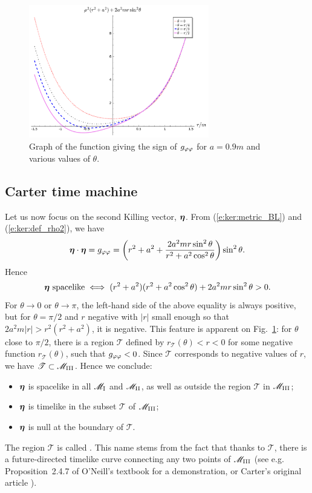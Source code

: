 \begin{figure}
\centerline{\includegraphics[width=0.7\textwidth]{ker_sign_gpp.pdf}}
\caption[]{\label{f:ker:sign_gpp} \footnotesize
Graph of the function giving the sign of $g_{\varphi\varphi}$ for $a=0.9m$
and various values of $\theta$.}
\end{figure}

\subsection{Carter time machine}

Let us now focus on the second Killing vector, $\bm{\eta}$.
From (\ref{e:ker:metric_BL}) and (\ref{e:ker:def_rho2}), we have
\[
    \bm{\eta}\cdot\bm{\eta} = g_{\varphi\varphi} = \left( r^2 + a^2 + \frac{2 a^2 m r \sin^2\theta}{r^2 + a^2\cos^2\theta} \right) \sin^2\theta .
\]
Hence
\[
    \bm{\eta}\ \mbox{spacelike} \iff
        (r^2 + a^2)(r^2 + a^2\cos^2\theta) + 2 a^2 m r \sin^2\theta > 0 .
\]
For $\theta\rightarrow 0$ or $\theta\rightarrow\pi$, the left-hand side of the above equality
is always positive, but for $\theta=\pi/2$ and $r$ negative with $|r|$
small enough so that $2 a^2 m |r| > r^2(r^2 + a^2)$, it is negative. This feature
is apparent on Fig.~\ref{f:ker:sign_gpp}: for $\theta$ close to $\pi/2$,
there is a region $\mathscr{T}$ defined by $r_{\mathscr{T}}(\theta) < r < 0$ for some
negative function $r_{\mathscr{T}}(\theta)$, such that $g_{\varphi\varphi}<0$.
Since $\mathscr{T}$ corresponds to negative values of $r$, we have
$\mathscr{T}\subset \mathscr{M}_{\rm III}$.
Hence we conclude:
\begin{itemize}
\item $\bm{\eta}$ is spacelike in all $\mathscr{M}_{\rm I}$ and $\mathscr{M}_{\rm II}$, as well
as outside the region $\mathscr{T}$ in $\mathscr{M}_{\rm III}$;
\item $\bm{\eta}$ is timelike in the subset $\mathscr{T}$ of $\mathscr{M}_{\rm III}$;
\item $\bm{\eta}$ is null at the boundary of $\mathscr{T}$.
\end{itemize}
The region $\mathscr{T}$ is called
.
This name stems from the fact that thanks to $\mathscr{T}$, there is
a future-directed timelike curve connecting any two points of $\mathscr{M}_{\rm III}$
(see e.g. Proposition~2.4.7 of O'Neill's textbook \cite{ONeil95} for a
demonstration, or Carter's original article \cite{Carte68}).

